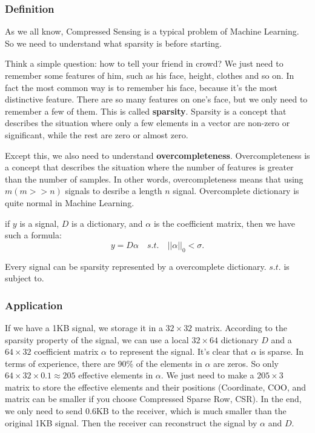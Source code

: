 \documentclass[12pt]{ctexart}
\begin{document}
\subsubsection{\textbf{Definition}}

As we all know, Compressed Sensing is a typical problem of Machine Learning. So we need
to understand what sparsity is before starting.

Think a simple question: how to tell your friend in crowd? We just need to remember some
features of him, such as his face, height, clothes and so on. In fact the most common way
is to remember his face, because it's the most distinctive feature. There are so many
features on one's face, but we only need to remember a few of them. This is called
\textbf{sparsity}. Sparsity is a concept that describes the situation where only a few
elements in a vector are non-zero or significant, while the rest are zero or almost zero.

Except this, we also need to understand \textbf{overcompleteness}. Overcompleteness is a
concept that describes the situation where the number of features is greater than the
number of samples. In other words, overcompleteness means that using $m (m>>n)$ signals
to desribe a length $n$ signal. Overcomplete dictionary is quite normal in Machine Learning.

if $y$ is a signal, $D$ is a dictionary, and $\alpha$ is the coefficient matrix, then we have
such a formula:
\[
  y = D\alpha \quad s.t. \quad ||\alpha||_0 < \sigma.
\]

Every signal can be sparsity represented by a overcomplete dictionary. $s.t.$ is subject to.


\subsubsection{\textbf{Application}}

If we have a 1KB signal, we storage it in a $ 32 \times 32$ matrix. According to the sparsity
property of the signal, we can use a local $32 \times 64$ dictionary $D$ and a $64 \times
32$ coefficient matrix $\alpha$ to represent the signal. It's clear that $\alpha$ is sparse.
In terms of experience, there are 90\% of the elements in $\alpha$ are zeros. So only
$64 \times 32 \times 0.1 \approx 205$ effective elements in $\alpha$. We just need to
make a $205 \times 3$ matrix to store the effective elements and their positions (Coordinate,
COO, and matrix can be smaller if you choose Compressed Sparse Row, CSR). In the end, we only
need to send 0.6KB to the receiver, which is much smaller than the original 1KB signal. Then
the receiver can reconstruct the signal by $\alpha$ and $D$.
\end{document}
